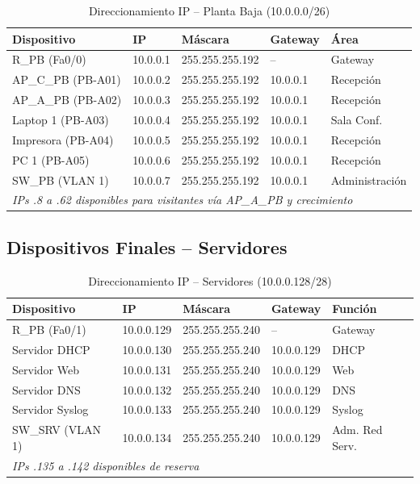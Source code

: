 \documentclass[letterpaper,11pt]{article}
\begin{document}
\begin{table}[H]
\centering
\caption{Direccionamiento IP -- Planta Baja (10.0.0.0/26)}
\small
\begin{tabular}{|l|l|l|l|l|}
\hline
\textbf{Dispositivo} & \textbf{IP} & \textbf{Máscara} & \textbf{Gateway} & \textbf{Área} \\
\hline
R\_PB (Fa0/0) & 10.0.0.1 & 255.255.255.192 & -- & Gateway \\
AP\_C\_PB (PB-A01) & 10.0.0.2 & 255.255.255.192 & 10.0.0.1 & Recepción \\
AP\_A\_PB (PB-A02) & 10.0.0.3 & 255.255.255.192 & 10.0.0.1 & Recepción \\
Laptop 1 (PB-A03) & 10.0.0.4 & 255.255.255.192 & 10.0.0.1 & Sala Conf. \\
Impresora (PB-A04) & 10.0.0.5 & 255.255.255.192 & 10.0.0.1 & Recepción \\
PC 1 (PB-A05) & 10.0.0.6 & 255.255.255.192 & 10.0.0.1 & Recepción \\
SW\_PB (VLAN 1) & 10.0.0.7 & 255.255.255.192 & 10.0.0.1 & Administración \\
\hline
\multicolumn{5}{|l|}{\textit{IPs .8 a .62 disponibles para visitantes vía AP\_A\_PB y crecimiento}} \\
\hline
\end{tabular}
\end{table}

\subsection{Dispositivos Finales -- Servidores}

\begin{table}[H]
\centering
\caption{Direccionamiento IP -- Servidores (10.0.0.128/28)}
\small
\begin{tabular}{|l|l|l|l|l|}
\hline
\textbf{Dispositivo} & \textbf{IP} & \textbf{Máscara} & \textbf{Gateway} & \textbf{Función} \\
\hline
R\_PB (Fa0/1) & 10.0.0.129 & 255.255.255.240 & -- & Gateway \\
Servidor DHCP & 10.0.0.130 & 255.255.255.240 & 10.0.0.129 & DHCP \\
Servidor Web & 10.0.0.131 & 255.255.255.240 & 10.0.0.129 & Web \\
Servidor DNS & 10.0.0.132 & 255.255.255.240 & 10.0.0.129 & DNS \\
Servidor Syslog & 10.0.0.133 & 255.255.255.240 & 10.0.0.129 & Syslog \\
SW\_SRV (VLAN 1) & 10.0.0.134 & 255.255.255.240 & 10.0.0.129 & Adm. Red Serv. \\
\hline
\multicolumn{5}{|l|}{\textit{IPs .135 a .142 disponibles de reserva}} \\
\hline
\end{tabular}
\end{table}
\end{document}
